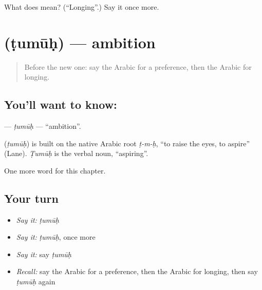 \begin{tcolorbox}[breakable,colback=teal!4,colframe=teal!35!black,title={Before you move on}]
What does  mean? (\textquotedblleft{}Longing\textquotedblright{}.) Say it once more.
\end{tcolorbox}
\section[\texorpdfstring{\ar{طموح} (ṭumūḥ)}{طموح (ṭumūḥ)}]{ (ṭumūḥ) — ambition}

\label{lesson:AR-C112-tumuh}



\begin{quote}
Before the new one: say the Arabic for a preference, then the Arabic for longing.
\end{quote}

\subsection*{You'll want to know: }
\textbf{} — \emph{ṭumūḥ} — \textquotedblleft{}ambition\textquotedblright{}.

\begin{cousinweb}
\textbf{} (\emph{ṭumūḥ}) is built on the native Arabic root \emph{ṭ-m-ḥ}, \textquotedblleft{}to raise the eyes, to aspire\textquotedblright{} (Lane). \emph{Ṭumūḥ} is the verbal noun, \textquotedblleft{}aspiring\textquotedblright{}.
\end{cousinweb}

\begin{grammarlens}[title={What you've built}]
One more word for this chapter.
\end{grammarlens}

\subsection*{Your turn}
\begin{itemize}
\raggedright
  \item \emph{Say it:} \emph{ṭumūḥ}
  \item \emph{Say it:} \emph{ṭumūḥ}, once more
  \item \emph{Say it:} say \emph{ṭumūḥ}
  \item \emph{Recall:} say the Arabic for a preference, then the Arabic for longing, then say \emph{ṭumūḥ} again
\end{itemize}

